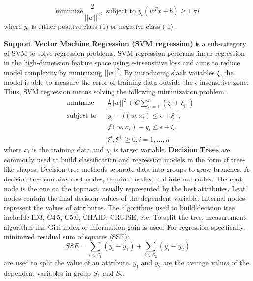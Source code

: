 \documentclass[12pt,english]{report}
\begin{document}
\begin{equation}
\text{minimize} \ \frac{2}{||w||^2},
\text{ subject to }
y_{i}(w^T x +b) \geq 1 \ \forall i
\end{equation}
where $y_i$ is either positive class (1) or negative class (-1).

\vspace{0.15in}
\noindent \textbf{Support Vector Machine Regression (SVM regression)} is a sub-category of SVM to solve regression problems.  SVM regression performs linear regression in the high-dimension feature space using  $\epsilon$-insensitive loss and aims to reduce model complexity by minimizing $||w||^2$. By introducing slack variables $\xi$, the model is able to measure the error of training data outside the $\epsilon$-insensitive zone.
Thus,  SVM regression means solving the following minimization problem: 
\begin{equation}
    \begin{aligned}
     &   \text{minimize}
     & & \frac{1}{2} {||w||^2} + C \sum_{n=1}^{n}(\xi_i + \xi_i^+) \\
     & \text{subject to} 
     & & y_{i} - f(w,x_i) \leq  \epsilon + \xi^+, \\
     &&& f(w,x_i) - y_{i} \leq \epsilon + \xi, \\
     &&& \xi^i, \xi^+ \geq 0, i=1,\dots,n
    \end{aligned}
\end{equation}
where  $x_i$ is the training data and $y_i$ is target variable.
% 
% 
\vspace{0.15in}
\noindent \textbf{Decision Trees} are commonly used to build classification and regression models in the form of tree-like  shapes. Decision tree methods separate data into groups to grow branches. A decision tree contains root nodes, terminal nodes, and internal nodes. The root node is the one on the topmost, usually represented by the best attributes. Leaf nodes contain the final decision values of the dependent variable. Internal nodes represent the values of attributes. The algorithms used to build decision tree includde ID3, C4.5, C5.0, CHAID, CRUISE, etc. To split the tree, measurement algorithm like Gini index or information gain is used. For regression specifically, minimized  residual sum of squares (SSE):
\begin{equation}
    SSE = \sum_{i \in S_1} (y_i - \overline{y_1}) + \sum_{i \in S_2} (y_i - \overline{y_2})
\end{equation}
are used to split the value of an attribute. $\overline{y_1}$ and $\overline{y_2}$ are the average values of the dependent variables in group $S_1$ and $S_2$. 
\end{document}
